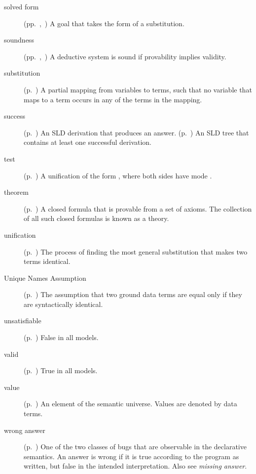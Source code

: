 \begin{description}
\item[solved form]
(pp.~\pageref{gi:solved-form},~\pageref{gi:solved-form2})
A goal that takes the form of a substitution.

\item[soundness]
(pp.~\pageref{thm:soundness},~\pageref{gi:soundness2})
A deductive system is sound if provability implies validity.

\item[substitution]
(p.~\pageref{gi:substitution})
A partial mapping from variables to terms,
such that no variable that maps to a term
occurs in any of the terms in the mapping.

\item[success]
(p.~\pageref{gi:success})
An SLD derivation that produces an answer.
(p.~\pageref{gi:success2})
An SLD tree that contains at least one successful derivation.

\item[test]
(p.~\pageref{gi:test})
A unification of the form ,
where both sides have mode .

\item[theorem]
(p.~\pageref{gi:theorem})
A closed formula that is provable from a set of axioms.
The collection of all such closed formulas is known as a theory.

\item[unification]
(p.~\pageref{sec:unification})
The process of finding the most general substitution
that makes two terms identical.

\item[Unique Names Assumption]
(p.~\pageref{gi:una})
The assumption that two ground data terms are equal
only if they are syntactically identical.

\item[unsatisfiable]
(p.~\pageref{gi:unsatisfiable})
False in all models.

\item[valid]
(p.~\pageref{gi:valid})
True in all models.

\item[value]
(p.~\pageref{gi:value})
An element of the semantic universe.
Values are denoted by data terms.

\item[wrong answer]
(p.~\pageref{gi:wrong-answer})
One of the two classes of bugs
that are observable in the declarative semantics.
An answer is wrong if it is true according to the program as written,
but false in the intended interpretation.
Also see \emph{missing answer}.

\end{description}
